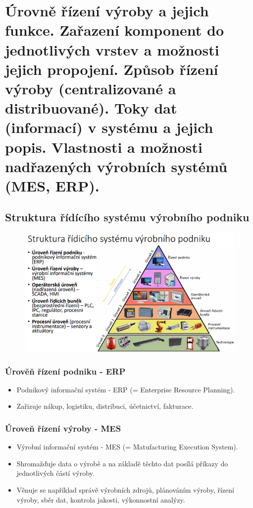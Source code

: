\section{Úrovně řízení výroby a jejich funkce. Zařazení komponent do jednotlivých vrstev a možnosti jejich propojení. Způsob řízení výroby (centralizované a distribuované). Toky dat (informací) v systému a jejich popis. Vlastnosti a možnosti nadřazených výrobních systémů (MES, ERP).}
\subsection{Struktura řídícího systému výrobního podniku}
\begin{figure}[h]
    \begin{center}
        \includegraphics[width=\textwidth]{img/rizeni.png}
    \end{center}
\end{figure}

\subsubsection*{Úrověň řízení podniku - ERP}
\begin{itemize}
    \item Podnikový informační systém - ERP (= Enterprise Resource Planning).
    \item Zařizuje nákup, logistiku, distribuci, účetnictví, fakturace.
\end{itemize}

\subsubsection*{Úroveň řízení výroby - MES}
\begin{itemize}
    \item Výrobní informační systém - MES (= Matufacturing Execution System).
    \item Shromažďuje data o výrobě a na základě těchto dat posílá příkazy do jednotlivých částí výroby.
    \item Věnuje se například správě výrobních zdrojů, plánováním výroby, řízení výroby, sběr dat, kontrola jakosti, výkonnostní analýzy.
\end{itemize}

